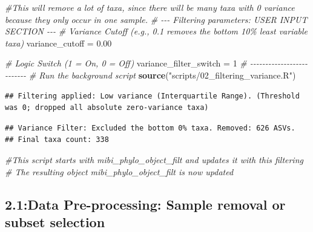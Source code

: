 \documentclass[
]{article}
\newenvironment{Shaded}{\begin{snugshade}}{\end{snugshade}}
\newcommand{\CommentTok}[1]{\textcolor[rgb]{0.56,0.35,0.01}{\textit{#1}}}
\newcommand{\DecValTok}[1]{\textcolor[rgb]{0.00,0.00,0.81}{#1}}
\newcommand{\FloatTok}[1]{\textcolor[rgb]{0.00,0.00,0.81}{#1}}
\newcommand{\FunctionTok}[1]{\textcolor[rgb]{0.13,0.29,0.53}{\textbf{#1}}}
\newcommand{\NormalTok}[1]{#1}
\newcommand{\OtherTok}[1]{\textcolor[rgb]{0.56,0.35,0.01}{#1}}
\newcommand{\StringTok}[1]{\textcolor[rgb]{0.31,0.60,0.02}{#1}}
\begin{document}
\begin{Shaded}
\begin{Highlighting}[]
\CommentTok{\#This will remove a lot of taxa, since there will be many taxa with 0 variance because they only occur in one sample.}
\CommentTok{\# {-}{-}{-} Filtering parameters: USER INPUT SECTION {-}{-}{-}}
\CommentTok{\# Variance Cutoff (e.g., 0.1 removes the bottom 10\% least variable taxa)}
\NormalTok{variance\_cutoff }\OtherTok{=} \FloatTok{0.00}

\CommentTok{\# Logic Switch (1 = On, 0 = Off)}
\NormalTok{variance\_filter\_switch }\OtherTok{=} \DecValTok{1} 
\CommentTok{\# {-}{-}{-}{-}{-}{-}{-}{-}{-}{-}{-}{-}{-}{-}{-}{-}{-}{-}{-}{-}{-}{-}{-}{-}{-}{-}}
\CommentTok{\# Run the background script}
\FunctionTok{source}\NormalTok{(}\StringTok{"scripts/02\_filtering\_variance.R"}\NormalTok{)}
\end{Highlighting}
\end{Shaded}

\begin{verbatim}
## Filtering applied: Low variance (Interquartile Range). (Threshold was 0; dropped all absolute zero-variance taxa)
\end{verbatim}

\begin{verbatim}
## Variance Filter: Excluded the bottom 0% taxa. Removed: 626 ASVs.
## Final taxa count: 338
\end{verbatim}

\begin{Shaded}
\begin{Highlighting}[]
\CommentTok{\#This script starts with mibi\_phylo\_object\_filt and updates it with this filtering }
\CommentTok{\# The resulting object \textquotesingle{}mibi\_phylo\_object\_filt\textquotesingle{} is now updated}
\end{Highlighting}
\end{Shaded}

\subsection{2.1:Data Pre-processing: Sample removal or subset
selection}\label{data-pre-processing-sample-removal-or-subset-selection}
\end{document}
